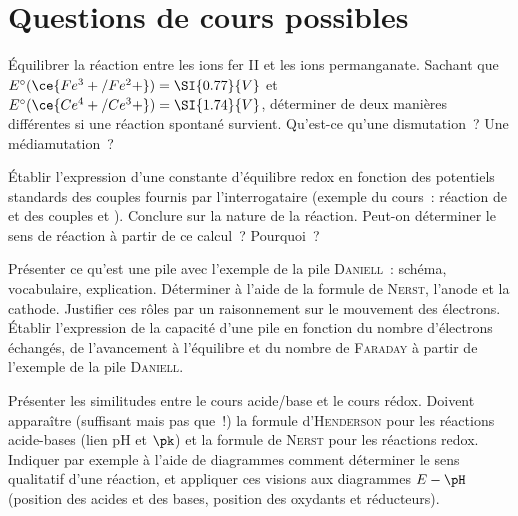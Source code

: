 \documentclass[a4paper, 11pt, final, garamond]{book}
\begin{document}
\newpage
\section{Questions de cours possibles}
\begin{enumerate}[label=\sqenumi]

	\litem{23pt}{\str}%
	Équilibrer la réaction entre les ions fer II et les ions permanganate.
	Sachant que $E^\circ(\ce{Fe^3+/Fe^2+}) = \SI{0.77}{V}$ et
	$E^\circ(\ce{Ce^4+/Ce^3+}) = \SI{1.74}{V}$, déterminer de deux manières
	différentes si une réaction spontané survient. Qu'est-ce qu'une
	dismutation~? Une médiamutation~?

	\litem{23pt}{\strr}%
	Établir l'expression d'une constante d'équilibre redox en fonction des
	potentiels standards des couples fournis par l'interrogataire (exemple du
	cours~: réaction de  et  des couples  et
	). Conclure sur la nature de la réaction. Peut-on
	déterminer le sens de réaction à partir de ce calcul~? Pourquoi~?

	\litem{23pt}{\strr}%
	Présenter ce qu'est une pile avec l'exemple de la pile
	\textsc{Daniell}~: schéma, vocabulaire, explication. Déterminer à l'aide
	de la formule de \textsc{Nerst}, l'anode et la cathode. Justifier ces
	rôles par un raisonnement sur le mouvement des électrons. Établir
	l'expression de la capacité d'une pile en fonction du nombre d'électrons
	échangés, de l'avancement à l'équilibre et du nombre de \textsc{Faraday}
	à partir de l'exemple de la pile \textsc{Daniell}.

	\litem{23pt}{\str}%
	Présenter les similitudes entre le cours acide/base et le cours rédox.
	Doivent apparaître (suffisant mais pas que~!) la formule
	d'\textsc{Henderson} pour les réactions acide-bases (lien pH et $\pk$) et
	la formule de \textsc{Nerst} pour les réactions redox. Indiquer par
	exemple à l'aide de diagrammes comment déterminer le sens qualitatif d'une
	réaction, et appliquer ces visions aux diagrammes $E-\pH$ (position des
	acides et des bases, position des oxydants et réducteurs).


\end{enumerate}
\end{document}
